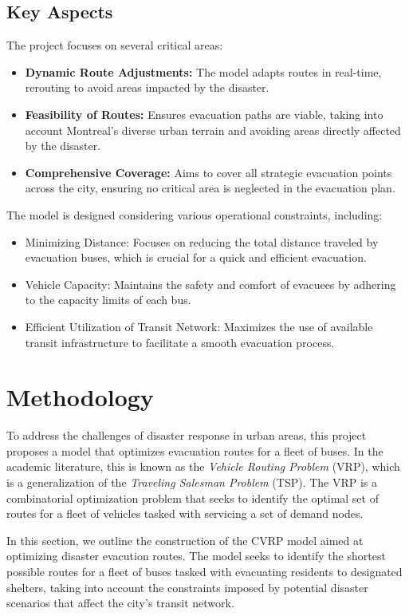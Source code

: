 \documentclass[12pt]{article}
\begin{document}
\subsection{Key Aspects}

The project focuses on several critical areas:
\begin{itemize}
    \item \textbf{Dynamic Route Adjustments:} The model adapts routes in real-time, rerouting to avoid areas impacted by the disaster.
    \item \textbf{Feasibility of Routes:} Ensures evacuation paths are viable, taking into account Montreal’s diverse urban terrain and avoiding areas directly affected by the disaster.
    \item \textbf{Comprehensive Coverage:} Aims to cover all strategic evacuation points across the city, ensuring no critical area is neglected in the evacuation plan.
\end{itemize}
The model is designed considering various operational constraints, including:
\begin{itemize}
    \item Minimizing Distance: Focuses on reducing the total distance traveled by evacuation buses, which is crucial for a quick and efficient evacuation.
    \item Vehicle Capacity: Maintains the safety and comfort of evacuees by adhering to the capacity limits of each bus.
    \item Efficient Utilization of Transit Network: Maximizes the use of available transit infrastructure to facilitate a smooth evacuation process.
\end{itemize}

\section{Methodology}
To address the challenges of disaster response in urban areas, this project proposes a model that optimizes evacuation routes for a fleet of buses.
In the academic literature, this is known as the \textit{Vehicle Routing Problem} (VRP), which is a generalization of the \textit{Traveling Salesman Problem} (TSP).
The VRP is a combinatorial optimization problem that seeks to identify the optimal set of routes for a fleet of vehicles tasked with servicing a set of demand nodes.


In this section, we outline the construction of the CVRP model aimed at optimizing disaster evacution routes.
The model seeks to identify the shortest possible routes for a fleet of buses tasked with evacuating residents to designated shelters, taking into account the constraints imposed by potential disaster scenarios that affect the city's transit network.
\end{document}
